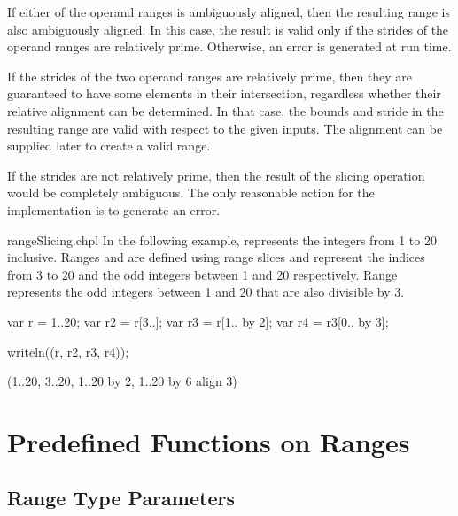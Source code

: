If either of the operand ranges is ambiguously aligned, then the resulting range
is also ambiguously aligned.  In this case, the result is valid only if the
strides of the operand ranges are relatively prime.  Otherwise, an error is
generated at run time.

\begin{rationale}
If the strides of the two operand ranges are relatively prime, then they are
guaranteed to have some elements in their intersection, regardless whether their
relative alignment can be determined.  In that case, the bounds and stride in the resulting
range are valid with respect to the given inputs.
The alignment can be supplied later to create a valid range.

If the strides are not relatively prime, then the result of the slicing
operation would be completely ambiguous.  The only reasonable action for the
implementation is to generate an error.
\end{rationale}

\begin{chapelexample}{rangeSlicing.chpl}
In the following example,  represents the integers from 1 to
20 inclusive.  Ranges  and  are defined using range
slices and represent the indices from 3 to 20 and the odd integers
between 1 and 20 respectively. Range  represents the odd
integers between 1 and 20 that are also divisible by 3.
\begin{chapel}
var r = 1..20;
var r2 = r[3..];
var r3 = r[1.. by 2];
var r4 = r3[0.. by 3];
\end{chapel}
\begin{chapelpost}
writeln((r, r2, r3, r4));
\end{chapelpost}
\begin{chapeloutput}
(1..20, 3..20, 1..20 by 2, 1..20 by 6 align 3)
\end{chapeloutput}
\end{chapelexample}


\section{Predefined Functions on Ranges}
\label{Predefined_Range_Functions}

\subsection{Range Type Parameters}
\label{Range_Type_Accessors}

